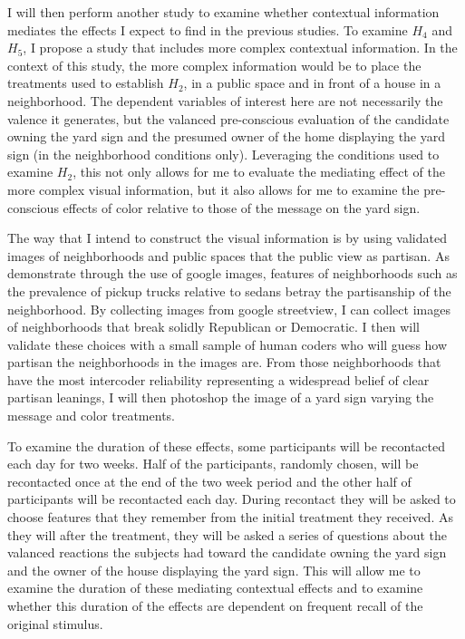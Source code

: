 \documentclass [12pt]{article}
\begin{document}
I will then perform another study to examine whether contextual information mediates the effects I expect to find in the previous studies. To examine $H_4$ and $H_5$, I propose a study that includes more complex contextual information. In the context of this study, the more complex information would be to place the treatments used to establish $H_2$, in a public space and in front of a house in a neighborhood. The dependent variables of interest here are not necessarily the valence it generates, but the valanced pre-conscious evaluation of the candidate owning the yard sign and the presumed owner of the home displaying the yard sign (in the neighborhood conditions only). Leveraging the conditions used to examine $H_2$, this not only allows for me to evaluate the mediating effect of the more complex visual information, but it also allows for me to examine the pre-conscious effects of color relative to those of the message on the yard sign.

The way that I intend to construct the visual information is by using validated images of neighborhoods and public spaces that the public view as partisan. As \citet{gebru_et-al_2017_pnas} demonstrate through the use of google images, features of neighborhoods such as the prevalence of pickup trucks relative to sedans betray the partisanship of the neighborhood. By collecting images from google streetview, I can collect images of neighborhoods that break solidly Republican or Democratic. I then will validate these choices with a small sample of human coders who will guess how partisan the neighborhoods in the images are. From those neighborhoods that have the most intercoder reliability representing a widespread belief of clear partisan leanings, I will then photoshop the image of a yard sign varying the message and color treatments.

To examine the duration of these effects, some participants will be recontacted each day for two weeks. Half of the participants, randomly chosen, will be recontacted once at the end of the two week period and the other half of participants will be recontacted each day. During recontact they will be asked to choose features that they remember from the initial treatment they received. As they will after the treatment, they will be asked a series of questions about the valanced reactions the subjects had toward the candidate owning the yard sign and the owner of the house displaying the yard sign. This will allow me to examine the duration of these mediating contextual effects and to examine whether this duration of the effects are dependent on frequent recall of the original stimulus.
\end{document}
